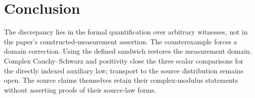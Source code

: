 \documentclass[11pt]{article}
\begin{document}
\section{Conclusion}

The discrepancy lies in the formal quantification over arbitrary witnesses,
not in the paper's constructed-measurement assertion. The counterexample
forces a domain correction. Using the defined sandwich restores the measurement
domain. Complex Cauchy--Schwarz and positivity close the three scalar
comparisons for the directly indexed auxiliary law;
transport to the source distribution remains
open. The source claims themselves retain their complex-modulus statements
without asserting proofs of their source-law forms.



\end{document}
